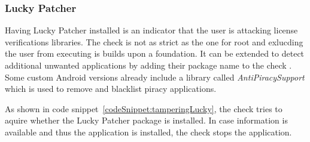 \subsubsection{Lucky Patcher} \label{subsection:counter-improve-tampering-luckypatcher}
Having Lucky Patcher installed is an indicator that the user is attacking license verifications libraries.
The check is not as strict as the one for root and exlucding the user from executing is builds upon a foundation.
It can be extended to detect additional unwanted applications by adding their package name to the check \cite{androidCrackingTools}.
Some custom Android versions already include a library called \textit{AntiPiracySupport} \cite{antipiracy} which is used to remove and blacklist piracy applications.
\newline

As shown in code snippet~\ref{codeSnippet:tamperingLucky}, the check tries to aquire whether the Lucky Patcher package is installed.
In case information is available and thus the application is installed, the check stops the application.
